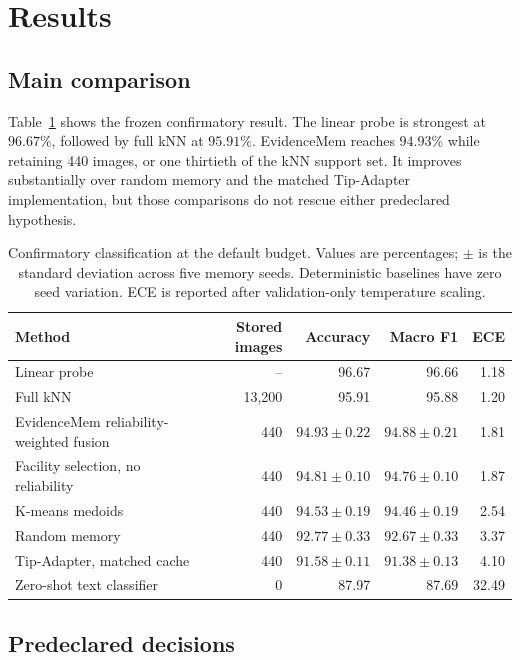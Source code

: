 \documentclass[10pt,twocolumn]{article}
\newcommand{\method}{EvidenceMem}
\begin{document}
\section{Results}
\label{sec:results}

\subsection{Main comparison}

Table~\ref{tab:main} shows the frozen confirmatory result. The linear probe is strongest
at $96.67\%$, followed by full kNN at $95.91\%$. \method{} reaches $94.93\%$ while
retaining 440 images, or one thirtieth of the kNN support set. It improves substantially
over random memory and the matched Tip-Adapter implementation, but those comparisons do
not rescue either predeclared hypothesis.

\begin{table}[t]
\centering
\small
\caption{Confirmatory classification at the default budget. Values are percentages;
$\pm$ is the standard deviation across five memory seeds. Deterministic baselines have
zero seed variation. ECE is reported after validation-only temperature scaling.}
\label{tab:main}
\begin{tabular}{lrrrr}
\toprule
Method & Stored images & Accuracy & Macro F1 & ECE \\
\midrule
Linear probe & -- & 96.67 & 96.66 & 1.18 \\
Full kNN & 13,200 & 95.91 & 95.88 & 1.20 \\
\method{} reliability-weighted fusion & 440 & $94.93\pm0.22$ & $94.88\pm0.21$ & 1.81 \\
Facility selection, no reliability & 440 & $94.81\pm0.10$ & $94.76\pm0.10$ & 1.87 \\
K-means medoids & 440 & $94.53\pm0.19$ & $94.46\pm0.19$ & 2.54 \\
Random memory & 440 & $92.77\pm0.33$ & $92.67\pm0.33$ & 3.37 \\
Tip-Adapter, matched cache & 440 & $91.58\pm0.11$ & $91.38\pm0.13$ & 4.10 \\
Zero-shot text classifier & 0 & 87.97 & 87.69 & 32.49 \\
\bottomrule
\end{tabular}
\end{table}

\subsection{Predeclared decisions}
\end{document}
